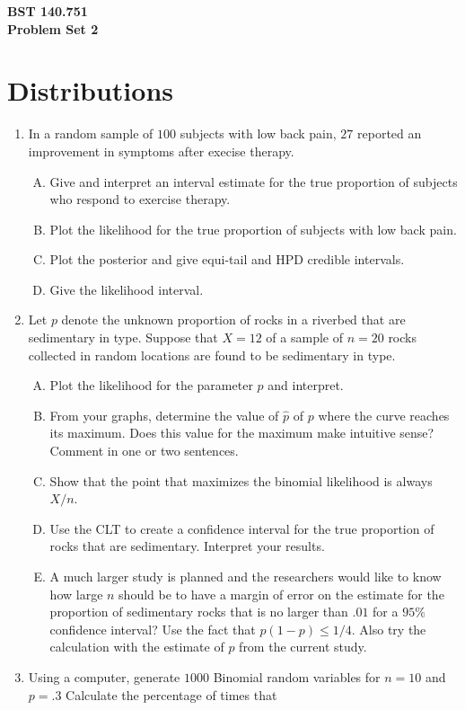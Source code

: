 \documentclass[12pt]{article}
\begin{document}
\noindent
{\bf BST 140.751 \\ Problem Set 2} \\
\section{Distributions}
\begin{enumerate}[1.]
\item In a random sample of $100$ subjects with low back pain, $27$
  reported an improvement in symptoms after execise therapy. 
  \begin{enumerate}[A.]
  \item Give and interpret an interval estimate for the true
    proportion of subjects who respond to exercise therapy.
  \item Plot the likelihood for the true proportion of subjects with low back pain.
  \item Plot the posterior and give equi-tail and HPD credible intervals.
  \item Give the likelihood interval.
  \end{enumerate}
\item  Let $p$ denote the unknown proportion of rocks in a riverbed
  that are sedimentary in type.  Suppose that $X = 12$ of a sample of
  $n = 20$ rocks collected in random locations are found to be
  sedimentary in type.
\begin{enumerate}[A.]
\item Plot the likelihood for the parameter $p$ and interpret.
\item From your graphs, determine the value of $\hat{p}$ of $p$ where
  the curve reaches its maximum.  Does this value for the maximum make
 intuitive sense?  Comment in one or two sentences.
\item Show that the point that maximizes the binomial likelihood is always $X/n$.
\item Use the CLT to create a confidence interval for the true
  proportion of rocks that are sedimentary. Interpret your results.
\item A much larger study is planned and the researchers would like to
  know how large $n$ should be to have a margin of error on the
  estimate for the proportion of sedimentary rocks that is no larger
  than $.01$ for a $95\%$ confidence interval? Use the fact that $p(1
  - p) \leq 1/4$. Also try the calculation with the estimate of $p$
  from the current study.
\end{enumerate}
\item Using a computer, generate $1000$ Binomial random variables for $n=10$ and $p =.3$ Calculate the percentage of times that 

\end{enumerate}
\end{document}
